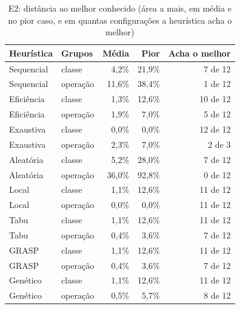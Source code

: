 \begin{table}[htbp]
\centering
\caption{E2: distância ao melhor conhecido (área a mais, em média e no pior caso, e em quantas configurações a heurística acha o melhor)}
\begin{tabular}{|l|l|r|r|r|}
\hline
\rowcolor{tabAzul}\color{white}Heurística & \color{white}Grupos & \color{white}Média & \color{white}Pior & \color{white}Acha o melhor \\
\hline
Sequencial & classe & 4,2\% & 21,9\% & 7 de 12 \\ \hline
Sequencial & operação & 11,6\% & 38,4\% & 1 de 12 \\ \hline
Eficiência & classe & 1,3\% & 12,6\% & 10 de 12 \\ \hline
Eficiência & operação & 1,9\% & 7,0\% & 5 de 12 \\ \hline
Exaustiva & classe & 0,0\% & 0,0\% & 12 de 12 \\ \hline
Exaustiva & operação & 2,3\% & 7,0\% & 2 de 3 \\ \hline
Aleatória & classe & 5,2\% & 28,0\% & 7 de 12 \\ \hline
Aleatória & operação & 36,0\% & 92,8\% & 0 de 12 \\ \hline
Local & classe & 1,1\% & 12,6\% & 11 de 12 \\ \hline
Local & operação & 0,0\% & 0,0\% & 11 de 12 \\ \hline
Tabu & classe & 1,1\% & 12,6\% & 11 de 12 \\ \hline
Tabu & operação & 0,4\% & 3,6\% & 7 de 12 \\ \hline
GRASP & classe & 1,1\% & 12,6\% & 11 de 12 \\ \hline
GRASP & operação & 0,4\% & 3,6\% & 7 de 12 \\ \hline
Genético & classe & 1,1\% & 12,6\% & 11 de 12 \\ \hline
Genético & operação & 0,5\% & 5,7\% & 8 de 12 \\ \hline
\end{tabular}
\end{table}

